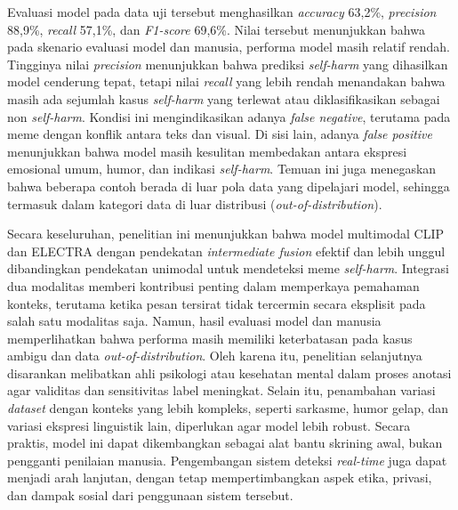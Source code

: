 \begin{center}
	Evaluasi model pada data uji tersebut menghasilkan \textit{accuracy} 63,2\%, \textit{precision} 88,9\%, \textit{recall} 57,1\%, dan \textit{F1-score} 69,6\%. Nilai tersebut menunjukkan bahwa pada skenario evaluasi model dan manusia, performa model masih relatif rendah. Tingginya nilai \textit{precision} menunjukkan bahwa prediksi \textit{self-harm} yang dihasilkan model cenderung tepat, tetapi nilai \textit{recall} yang lebih rendah menandakan bahwa masih ada sejumlah kasus \textit{self-harm} yang terlewat atau diklasifikasikan sebagai non \textit{self-harm}. Kondisi ini mengindikasikan adanya \textit{false negative}, terutama pada meme dengan konflik antara teks dan visual. Di sisi lain, adanya \textit{false positive} menunjukkan bahwa model masih kesulitan membedakan antara ekspresi emosional umum, humor, dan indikasi \textit{self-harm}. Temuan ini juga menegaskan bahwa beberapa contoh berada di luar pola data yang dipelajari model, sehingga termasuk dalam kategori data di luar distribusi (\textit{out-of-distribution}).

	Secara keseluruhan, penelitian ini menunjukkan bahwa model multimodal CLIP dan ELECTRA dengan pendekatan \textit{intermediate fusion} efektif dan lebih unggul dibandingkan pendekatan unimodal untuk mendeteksi meme \textit{self-harm}. Integrasi dua modalitas memberi kontribusi penting dalam memperkaya pemahaman konteks, terutama ketika pesan tersirat tidak tercermin secara eksplisit pada salah satu modalitas saja. Namun, hasil evaluasi model dan manusia memperlihatkan bahwa performa masih memiliki keterbatasan pada kasus ambigu dan data \textit{out-of-distribution}. Oleh karena itu, penelitian selanjutnya disarankan melibatkan ahli psikologi atau kesehatan mental dalam proses anotasi agar validitas dan sensitivitas label meningkat. Selain itu, penambahan variasi \textit{dataset} dengan konteks yang lebih kompleks, seperti sarkasme, humor gelap, dan variasi ekspresi linguistik lain, diperlukan agar model lebih robust. Secara praktis, model ini dapat dikembangkan sebagai alat bantu skrining awal, bukan pengganti penilaian manusia. Pengembangan sistem deteksi \textit{real-time} juga dapat menjadi arah lanjutan, dengan tetap mempertimbangkan aspek etika, privasi, dan dampak sosial dari penggunaan sistem tersebut.

	\vfill
	
\end{center}
\clearpage